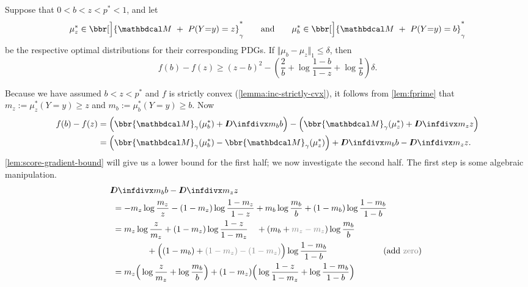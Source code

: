 \begin{lemma}\label{lem:D-lowerbound}
    Suppose that $0 < b < z < p^* < 1$,
    and let
    \[
        \mu_z^* \in \bbr[\Big]{\dg M ~+~ \Pr(Y{=}y )=z}^*_\gamma
        \qquad\text{and}\qquad
        \mu_b^* \in \bbr[\Big]{\dg M ~+~ \Pr(Y{=}y )=b}^*_\gamma
    \]
    be the respective optimal distributions for their corresponding PDGs.
    If $\Vert \mu_b - \mu_z \Vert_1 \le \delta$, then
    \[
        f(b) - f(z) \ge (z-b)^2 - \left( \frac2b   + \log \frac{1-b}{1-z} + \log \frac1b \right) \delta.
    \]
\end{lemma}
\begin{lproof}

    Because we have assumed $b < z < p^*$ and $f$ is strictly convex (\cref{lemma:inc-strictly-cvx}),  it follows from \cref{lem:fprime} that
        $m_z := \mu^*_z(Y{=}y) \ge z$ and
        $m_b := \mu^*_b(Y{=}y) \ge b$.
    Now
    \begin{align*}
        f(b) - f(z) &=
        \Big( \bbr{\dg M}_\gamma(\mu_b^*) +  \kldiv{ m_b }{b} \Big)
        -\Big( \bbr{\dg M}_\gamma(\mu_z^*) + \kldiv{ m_z }{z} \Big) \\
        &= \Big( \bbr{\dg M}_\gamma(\mu_b^*) - \bbr{\dg M}_\gamma(\mu_z^*) \Big)
         + \kldiv{m_b}{b} - \kldiv{m_z}{z}.
    \end{align*}
    \cref{lem:score-gradient-bound} will give us a lower bound for the first half;
    we now investigate the second half.
    The first step is some algebraic manipulation.
\def\squa#1{{\color{err#1}\blacksquare_{#1}}}
\begin{align*}
&\!\! \kldiv{m_b}{b} - \kldiv{m_z}z \\
&=
    -  m_z \log \frac{m_z}{z} - (1-m_z) \log \frac{1-m_z}{1-z}
    +  m_b \log \frac{m_b}{b} + (1-m_b) \log \frac{1-m_b}{1-b}
\\ &=
    m_z \log \frac{z}{m_z} + (1-m_z) \log \frac{1-z}{1-m_z}
    \quad+( m_b + {\color{zero}m_z - m_z} ) \log \frac{m_b}b
    \\&\qquad\qquad
     + \Big( (1-m_b) +{\color{zero}(1-m_z) - (1-m_z)} \Big)\log\frac{1-m_b}{1-b}
    &\hspace{-0.5cm}\text{(add {\color{zero}zero})}
 \\ &=
     m_z \Big( \log \frac{z}{m_z} + \log \frac{m_b}{b} \Big) +
     (1-m_z) \Big( \log \frac{1-z}{1-m_z} + \log \frac{1-m_b}{1-b} \Big)
        \\&\qquad\qquad

\end{align*}
\end{lproof}
